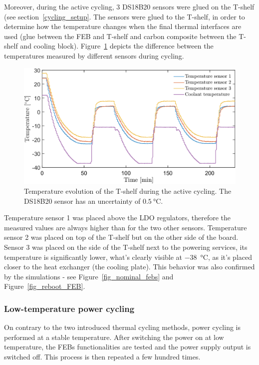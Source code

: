 Moreover, during the active cycling, 3 DS18B20 sensors were glued on the T-shelf (see section~\ref{cycling_setup}. The sensors were glued to the T-shelf, in order to determine how the temperature changes when the final thermal interfaces are used (glue between the FEB and T-shelf and carbon composite between the T-shelf and cooling block). Figure~\ref{fig_active_sensors} depicts the difference between the temperatures measured by different sensors during cycling. 

\begin{figure}[!h]
\centering
\includegraphics[width=0.75\columnwidth]{Chapter4/images/active.png}
\caption{Temperature evolution of the T-shelf during the active cycling. The DS18B20 \cite{DS18B20} sensor has an uncertainty of $\SI{0.5}{\celsius}$.}
\label{fig_active_sensors}
\end{figure}

\newpage
Temperature sensor 1 was placed above the \gls{LDO} regulators, therefore the measured values are always higher than for the two other sensors. Temperature sensor 2 was placed on top of the T-shelf but on the other side of the board. Sensor 3 was placed on the side of the T-shelf next to the powering services, its temperature is significantly lower, what's clearly visible at \SI{-38}{\celsius}, as it's placed closer to the heat exchanger (the cooling plate). This behavior was also confirmed by the simulations - see Figure~\ref{fig_nominal_febs} and Figure~\ref{fig_reboot_FEB}. 



\subsubsection{Low-temperature power cycling}
On contrary to the two introduced thermal cycling methods, power cycling is performed at a stable temperature. After switching the power on at low temperature, the \glspl{FEB} functionalities are tested and the power supply output is switched off. This process is then repeated a few hundred times. 

